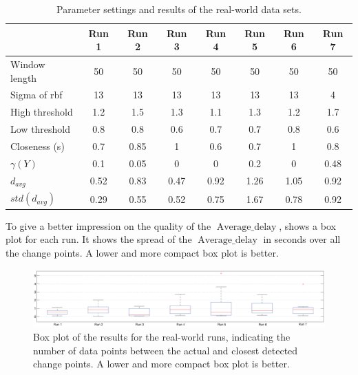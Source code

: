 \begin{table}
  \centering
  \caption[Results real world runs]{Parameter settings and results of the real-world data sets.}
  \begin{tabulary}{\textwidth}{|l|c|c|c|c|c|c|c|}
     & Run 1 & Run 2 & Run 3 & Run 4 & Run 5 & Run 6 & Run 7 \\
    \hline
    Window length & 50 & 50 & 50 & 50 & 50 & 50 & 50 \\
    \hline
    Sigma of \gls{rbf} & 13 & 13 & 13 & 13 & 13 & 13 & 4 \\
    \hline
    High threshold & 1.2 & 1.5 & 1.3 & 1.1 & 1.3 & 1.2 & 1.7 \\
    \hline
    Low threshold & 0.8 & 0.8 & 0.6 & 0.7 & 0.7 & 0.8 & 0.6 \\
    \hline
    Closeness (s) & 0.7 & 0.85 & 1 & 0.6 & 0.7 & 1 & 0.8 \\
    \hline
    \hline
    $\gamma(Y)$ & 0.1 & 0.05 & 0 & 0 & 0.2 & 0 & 0.48 \\
    \hline
    $d_{avg}$ & 0.52 & 0.83 & 0.47 & 0.92 & 1.26 & 1.05 & 0.92 \\
    \hline
    $std(d_{avg})$ & 0.29 & 0.55 & 0.52 & 0.75 & 1.67 & 0.78 & 0.92 \\
    \hline
  \end{tabulary}
  \label{tab:results_real_world}
\end{table}

To give a better impression on the quality of the $\operatorname*{Average\_delay}$,  shows a box plot for each run.
It shows the spread of the $\operatorname*{Average\_delay}$ in seconds over all the change points.
A lower and more compact box plot is better.

\begin{figure}
\centering
  \includegraphics[width=1\textwidth]{./Figures/chapter6/data_collection/boxplot_results_real_world_runs.eps}
  \caption[Box plot results real-world runs]{Box plot of the results for the real-world runs, indicating the number of data points between the actual and closest detected change points. A lower and more compact box plot is better.}
  \label{fig:boxplot_real_world_runs}
\end{figure}

